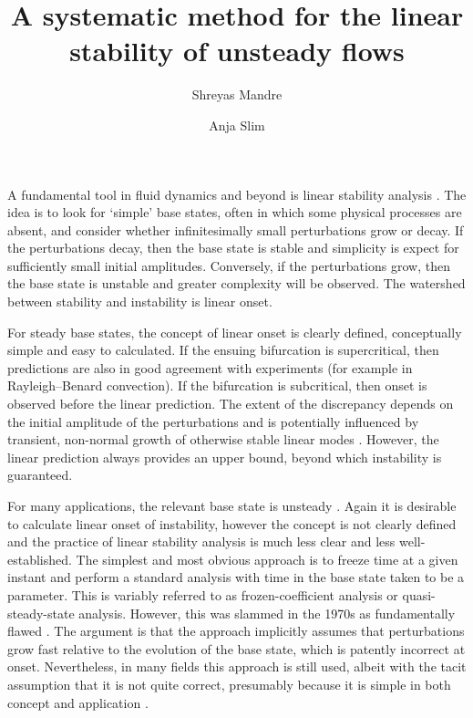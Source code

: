 \documentclass[letterpaper,prl,aps,reprint,superscriptaddress]{revtex4-1}
\begin{document}
\title{A systematic method for the linear stability of unsteady flows}
\author{Shreyas Mandre}
\author{Anja Slim}

\maketitle


A fundamental tool in fluid dynamics and beyond is linear stability analysis \cite{DrazinReid}.  The idea is to look for `simple' base states, often in which some physical processes are absent, and consider whether infinitesimally small perturbations grow or decay.  If the perturbations decay, then the base state is stable and simplicity is expect for sufficiently small initial amplitudes.  Conversely, if the perturbations grow, then the base state is unstable and greater complexity will be observed.  The watershed between stability and instability is linear onset.  

For steady base states, the concept of linear onset is clearly defined, conceptually simple and easy to calculated.  If the ensuing bifurcation is supercritical, then predictions are also in good agreement with experiments (for example in Rayleigh--Benard convection).  If the bifurcation is subcritical, then onset is observed before the linear prediction.   The extent of the discrepancy depends on the initial amplitude of the perturbations and is potentially influenced by transient, non-normal growth of otherwise stable linear modes \cite{Trefethen}.  However, the linear prediction always provides an upper bound, beyond which instability is guaranteed.  

For many applications, the relevant base state is unsteady \cite{lots of refs to various fields}.  Again it is desirable to calculate linear onset of instability, however the concept is not clearly defined and the practice of linear stability analysis is much less clear and less well-established.  The simplest and most obvious approach is to freeze time at a given instant and perform a standard analysis with time in the base state taken to be a parameter.  This is variably referred to as frozen-coefficient analysis or quasi-steady-state analysis.  However, this was slammed in the 1970s as fundamentally flawed \cite{GreshoSani71,Homsy}.  The argument is that the approach implicitly assumes that perturbations grow fast relative to the evolution of the base state, which is patently incorrect at onset.  Nevertheless, in many fields this approach is still used, albeit with the tacit assumption that it is not quite correct, presumably because it is simple in both concept and application \cite{Meiburg,BertozziBrenner}.
\end{document}
